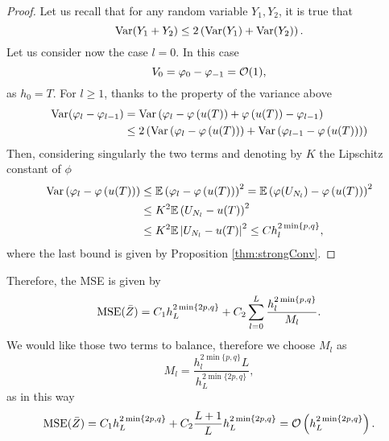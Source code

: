 \begin{proof} Let us recall that for any random variable $Y_1, Y_2$, it is true that
\begin{equation}
	 \operatorname{Var}(Y_1 + Y_2) \leq 2 \left(\operatorname{Var}(Y_1) + \operatorname{Var}(Y_2)\right).
\end{equation}
Let us consider now the case $l = 0$. In this case
\begin{equation}
	V_0 = \varphi_0 - \varphi_{-1} = \mathcal{O}(1),
\end{equation}
as $h_0 = T$. For $l \geq 1$, thanks to the property of the variance above 
\begin{equation}
\begin{aligned}
	\operatorname{Var}(\varphi_l - \varphi_{l-1}) &= \operatorname{Var}\left(\varphi_l - \varphi\left(u(T)\right) + \varphi\left(u(T)\right) - \varphi_{l-1}\right) \\
		&\leq 2\left(\operatorname{Var}\left(\varphi_l - \varphi\left(u(T)\right)\right) + \operatorname{Var}\left(\varphi_{l-1} - \varphi\left(u(T)\right)\right)\right)
\end{aligned}
\end{equation}
Then, considering singularly the two terms and denoting by $K$ the Lipschitz constant of $\phi$
\begin{equation}
\begin{aligned}
	\operatorname{Var}\left(\varphi_l - \varphi\left(u(T)\right)\right) &\leq \mathbb{E} \left(\varphi_l - \varphi\left(u(T)\right)\right)^2  = \mathbb{E} \left(\varphi(U_{N_l}) - \varphi\left(u(T)\right)\right)^2 \\
			&\leq K^2 \mathbb{E} \left(U_{N_l} - u(T)\right)^2  \\
			&\leq K^2 \mathbb{E}\left|U_{N_l} - u(T)\right|^2 \leq Ch_l^{2\min\{p, q\}},
\end{aligned}
\end{equation}
where the last bound is given by Proposition \ref{thm:strongConv}.
\end{proof}
\noindent Therefore, the MSE is given by
\begin{equation}
	\operatorname{MSE}(\bar Z) = C_1 h^{2\min\{2p, q\}}_L + C_2 \sum_{l=0}^L \frac{h_l^{2\min\{p, q\}}}{M_l}.
\end{equation}
We would like those two terms to balance, therefore we choose $M_l$ as
\begin{equation}
	M_l = \frac{h_l^{2\min\{p, q\}}L}{h_L^{2\min\{2p, q\}}},
\end{equation}
as in this way 
\begin{equation}
	\operatorname{MSE}(\bar Z) = C_1 h^{2\min\{2p, q\}}_L + C_2 \frac{L+1}{L} h_L^{2\min\{2p, q\}} = \mathcal{O}\left(h^{2\min\{2p, q\}}_L\right).
\end{equation}
